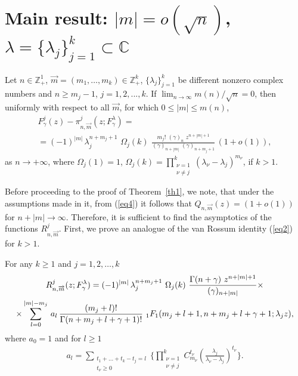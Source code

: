 \documentclass[
11pt,%
tightenlines,%
twoside,%
onecolumn,%
nofloats,%
nobibnotes,%
nofootinbib,%
superscriptaddress,%
noshowpacs,%
centertags]%
{revtex4}
\begin{document}

\section{Main result: $|m|=o(\sqrt{n})$,
	$\lambda=\{\lambda_j\}_{j=1}^k\subset \mathbb{C}$}


\begin{theorem}\label{th1}
     Let $n\in \mathbb{Z}^1_+$, $\overrightarrow{m}=(m_1,\ldots, m_k)\in
\mathbb{Z}^k_+$, $\{\lambda_j\}_{j=1}^k$ be different
nonzero complex numbers and $n\geqslant m_j-1$, $j=1,2,...,k$.
If $\lim_{n\rightarrow\infty}m(n)/\sqrt{n}=0$, then uniformly
with respect to all $\overrightarrow{m}$, for which
$0\leqslant |m| \leqslant m(n)$,
\begin{gather*}
F^{j}_{\gamma}(z)-\pi_{n,
\overrightarrow{m}}^j(z;F^{\lambda}_{\gamma})=\\
=(-1)^{|m|}\,\lambda_j^{n+m_j+1}\,\,\Omega_j(k)\,\,
\frac{m_j!\,\,(\gamma)_n\,\,z^{n+|m|+1}}{(\gamma)_{n+|m|}\,\,
(\gamma)_{n+m_j+1}}\,(1+o(1)),
\end{gather*}
as $n\rightarrow+\infty$, where $\Omega_j(1)=1$, $\Omega_j(k)=\prod^{k}_{\substack{
  \nu=1 \\
  \nu\neq j
 }}
  (\lambda_{\nu}-\lambda_j)^{m_{\nu}}$, if $k> 1$.
\end{theorem}

Before proceeding to the proof of Theorem~\ref{th1},
we note, that under the assumptions made in it, from (\ref{eq4}) it
follows  that $Q_{n,\overrightarrow{m}}(z)=
(1+o(1))$ for $n+|m|\rightarrow\infty$. Therefore,
it is sufficient to find the asymptotics of the functions
$R_{n,\overrightarrow{m}}^j$. First, we prove an analogue
of the van Rossum identity (\ref{eq2}) for $k>1$.

\begin{theorem}\label{th2} For any $k\geqslant1$ and $j=1,2,\ldots,k$
\begin{gather}
R_{n,\overrightarrow{m}}^j(z;F^{\lambda}_{\gamma})=(-1)^{|m|}\,
\lambda_j^{n+m_j+1}\,\,\Omega_j(k)\,\,
\frac{\Gamma(n+\gamma)\,\,z^{n+|m|+1}}{(\gamma)_{n+|m|}}\times\notag\\
\times\sum_{l=0}^{|m|-m_j}\,a_l\,\frac{(m_j+l)!}{\Gamma(n+m_j+l+\gamma+1)!}\,
\,_1F_1(m_j+l+1,n+m_j+l+\gamma+1;\lambda_j z)\label{eq7},
\end{gather}
where $a_0=1$ and for $l\geqslant 1$
\begin{eqnarray}\label{eq8}
a_l=\sum_{\substack{t_1+\ldots+t_k-t_j=l\\
t_{\nu}\geqslant0}}\biggl\{\prod^{k}_{\substack{\nu=1 \\
\nu\neq j }}C^{t_{\nu}}_{m_{\nu}}\left(\frac{\lambda_j}
{\lambda_{\nu}-\lambda_j}\right)^{t_{\nu}}\biggl\}.
\end{eqnarray}
\end{theorem}
\end{document}
